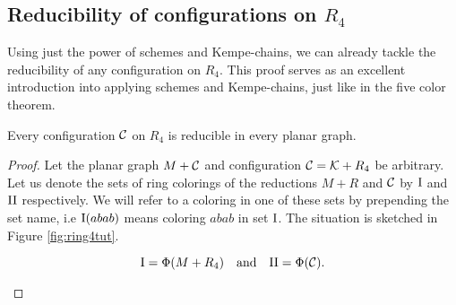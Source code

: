 \subsection{Reducibility of configurations on $R_4$}

Using just the power of schemes and Kempe-chains, we can already tackle the reducibility of any configuration on $R_4$. This proof serves as an excellent introduction into applying schemes and Kempe-chains, just like in the five color theorem.

\begin{theorem}
    Every configuration $\mathcal{C}$ on $R_4$ is reducible in every planar graph.
\end{theorem}
\begin{proof}

Let the planar graph $M+\mathcal{C}$ and configuration $\mathcal{C} = \mathcal{K} + R_4$ be arbitrary. Let us denote the sets of ring colorings of the reductions $M+R$ and $\mathcal{C}$ by $\text{I}$ and $\text{II}$ respectively. We will refer to a coloring in one of these sets by prepending the set name, i.e $\text{I}(abab)$ means coloring $abab$ in set $\text{I}$. The situation is sketched in Figure \ref{fig:ring4tut}. 

\begin{equation}
    \text{I} = \Phi(M+R_4) \quad \text{and} \quad \text{II} = \Phi(\mathcal{C}).
\end{equation}

\begin{figure}[!ht]
    \centering
\end{figure}
\end{proof}
